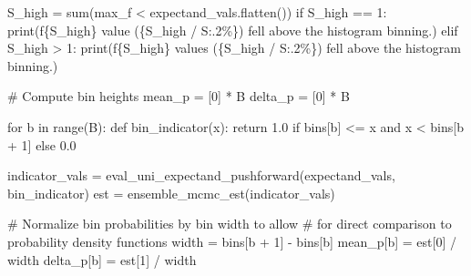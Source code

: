 \documentclass[
  letterpaper,
  DIV=11,
  numbers=noendperiod]{scrartcl}
\newenvironment{Shaded}{\begin{snugshade}}{\end{snugshade}}
\newcommand{\BuiltInTok}[1]{\textcolor[rgb]{0.00,0.23,0.31}{#1}}
\newcommand{\CommentTok}[1]{\textcolor[rgb]{0.37,0.37,0.37}{#1}}
\newcommand{\ControlFlowTok}[1]{\textcolor[rgb]{0.00,0.23,0.31}{#1}}
\newcommand{\DecValTok}[1]{\textcolor[rgb]{0.68,0.00,0.00}{#1}}
\newcommand{\FloatTok}[1]{\textcolor[rgb]{0.68,0.00,0.00}{#1}}
\newcommand{\KeywordTok}[1]{\textcolor[rgb]{0.00,0.23,0.31}{#1}}
\newcommand{\NormalTok}[1]{\textcolor[rgb]{0.00,0.23,0.31}{#1}}
\newcommand{\OperatorTok}[1]{\textcolor[rgb]{0.37,0.37,0.37}{#1}}
\newcommand{\SpecialCharTok}[1]{\textcolor[rgb]{0.37,0.37,0.37}{#1}}
\newcommand{\SpecialStringTok}[1]{\textcolor[rgb]{0.13,0.47,0.30}{#1}}
\newcommand{\StringTok}[1]{\textcolor[rgb]{0.13,0.47,0.30}{#1}}
\begin{document}
\begin{Shaded}
\begin{Highlighting}[]
\NormalTok{  S\_high }\OperatorTok{=} \BuiltInTok{sum}\NormalTok{(max\_f }\OperatorTok{\textless{}}\NormalTok{ expectand\_vals.flatten())}
  \ControlFlowTok{if}\NormalTok{ S\_high }\OperatorTok{==} \DecValTok{1}\NormalTok{:}
    \BuiltInTok{print}\NormalTok{(}\SpecialStringTok{f\textquotesingle{}}\SpecialCharTok{\{}\NormalTok{S\_high}\SpecialCharTok{\}}\SpecialStringTok{ value (}\SpecialCharTok{\{}\NormalTok{S\_high }\OperatorTok{/}\NormalTok{ S}\SpecialCharTok{:.2\%\}}\SpecialStringTok{)\textquotesingle{}}
           \StringTok{\textquotesingle{} fell above the histogram binning.\textquotesingle{}}\NormalTok{)}
  \ControlFlowTok{elif}\NormalTok{ S\_high }\OperatorTok{\textgreater{}} \DecValTok{1}\NormalTok{:}
    \BuiltInTok{print}\NormalTok{(}\SpecialStringTok{f\textquotesingle{}}\SpecialCharTok{\{}\NormalTok{S\_high}\SpecialCharTok{\}}\SpecialStringTok{ values (}\SpecialCharTok{\{}\NormalTok{S\_high }\OperatorTok{/}\NormalTok{ S}\SpecialCharTok{:.2\%\}}\SpecialStringTok{)\textquotesingle{}}
           \StringTok{\textquotesingle{} fell above the histogram binning.\textquotesingle{}}\NormalTok{)}

  \CommentTok{\# Compute bin heights}
\NormalTok{  mean\_p }\OperatorTok{=}\NormalTok{ [}\DecValTok{0}\NormalTok{] }\OperatorTok{*}\NormalTok{ B}
\NormalTok{  delta\_p }\OperatorTok{=}\NormalTok{ [}\DecValTok{0}\NormalTok{] }\OperatorTok{*}\NormalTok{ B}

  \ControlFlowTok{for}\NormalTok{ b }\KeywordTok{in} \BuiltInTok{range}\NormalTok{(B):}
    \KeywordTok{def}\NormalTok{ bin\_indicator(x):}
      \ControlFlowTok{return} \FloatTok{1.0} \ControlFlowTok{if}\NormalTok{ bins[b] }\OperatorTok{\textless{}=}\NormalTok{ x }\KeywordTok{and}\NormalTok{ x }\OperatorTok{\textless{}}\NormalTok{ bins[b }\OperatorTok{+} \DecValTok{1}\NormalTok{] }\ControlFlowTok{else} \FloatTok{0.0}

\NormalTok{    indicator\_vals }\OperatorTok{=}\NormalTok{ eval\_uni\_expectand\_pushforward(expectand\_vals,}
\NormalTok{                                                    bin\_indicator)}
\NormalTok{    est }\OperatorTok{=}\NormalTok{ ensemble\_mcmc\_est(indicator\_vals)}

    \CommentTok{\# Normalize bin probabilities by bin width to allow}
    \CommentTok{\# for direct comparison to probability density functions}
\NormalTok{    width }\OperatorTok{=}\NormalTok{ bins[b }\OperatorTok{+} \DecValTok{1}\NormalTok{] }\OperatorTok{{-}}\NormalTok{ bins[b]}
\NormalTok{    mean\_p[b] }\OperatorTok{=}\NormalTok{ est[}\DecValTok{0}\NormalTok{] }\OperatorTok{/}\NormalTok{ width}
\NormalTok{    delta\_p[b] }\OperatorTok{=}\NormalTok{ est[}\DecValTok{1}\NormalTok{] }\OperatorTok{/}\NormalTok{ width}


\end{Highlighting}
\end{Shaded}
\end{document}
